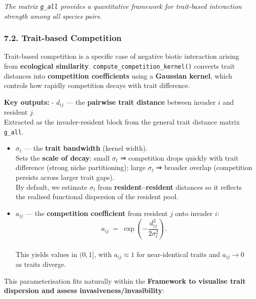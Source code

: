\documentclass[
]{article}
\begin{document}
\emph{The matrix \texttt{g\_all} provides a quantitative framework for
trait-based interaction strength among all species pairs.}

\hypertarget{trait-based-competition}{%
\subsubsection{7.2. Trait-based
Competition}\label{trait-based-competition}}

Trait-based competition is a specific case of negative biotic
interaction arising from \textbf{ecological similarity}.
\texttt{compute\_competition\_kernel()} converts trait distances into
\textbf{competition coefficients} using a \textbf{Gaussian kernel},
which controls how rapidly competition decays with trait difference.

\textbf{Key outputs:} - \textbf{\(d_{ij}\)} --- the \textbf{pairwise
trait distance} between invader \(i\) and resident \(j\).\\
Extracted as the invader-resident block from the general trait distance
matrix \texttt{g\_all}.

\begin{itemize}
\item
  \textbf{\(\sigma_t\)} --- the \textbf{trait bandwidth} (kernel
  width).\\
  Sets the \textbf{scale of decay}: small \(\sigma_t\) ⇒ competition
  drops quickly with trait difference (strong niche partitioning); large
  \(\sigma_t\) ⇒ broader overlap (competition persists across larger
  trait gaps).\\
  By default, we estimate \(\sigma_t\) from \textbf{resident--resident}
  distances so it reflects the realised functional dispersion of the
  resident pool.
\item
  \textbf{\(a_{ij}\)} --- the \textbf{competition coefficient} from
  resident \(j\) onto invader \(i\):\\
  \[
    a_{ij} \;=\; \exp\!\left(- \frac{d_{ij}^2}{2\sigma_t^2}\right).
  \]\\
  This yields values in \((0,1]\), with \(a_{ij}\approx 1\) for
  near-identical traits and \(a_{ij}\to 0\) as traits diverge.
\end{itemize}

This parameterisation fits naturally within the \textbf{Framework to
visualise trait dispersion and assess invasiveness/invasibility}:
\end{document}
